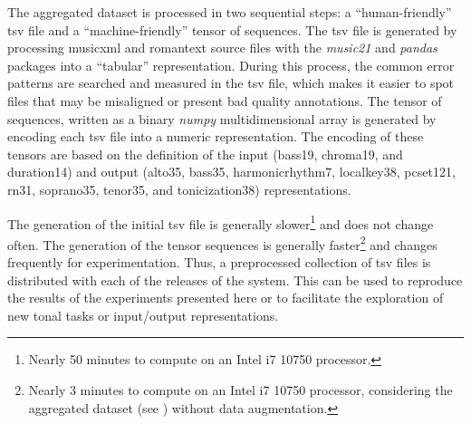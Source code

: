 
The aggregated dataset is processed in two sequential steps:
a ``human-friendly'' \gls{tsv} file and a
``machine-friendly'' tensor of sequences. The \gls{tsv} file
is generated by processing \gls{musicxml} and
\gls{romantext} source files with the \emph{music21}
\parencite{cuthbert2010music21} and \emph{pandas}
\parencite{mckinney2011pandas} packages into a ``tabular''
representation. During this process, the common error
patterns are searched and measured in the \gls{tsv} file,
which makes it easier to spot files that may be misaligned
or present bad quality annotations. The tensor of sequences,
written as a binary \emph{numpy}
\parencite{oliphant2006guide} multidimensional array is
generated by encoding each \gls{tsv} file into a numeric
representation. The encoding of these tensors are based on
the definition of the input (\gls{bass19}, \gls{chroma19},
and \gls{duration14}) and output (\gls{alto35},
\gls{bass35}, \gls{harmonicrhythm7}, \gls{localkey38},
\gls{pcset121}, \gls{rn31}, \gls{soprano35}, \gls{tenor35},
and \gls{tonicization38}) representations.

The generation of the initial \gls{tsv} file is generally
slower\footnote{Nearly 50 minutes to compute on an Intel i7
10750 processor.} and does not change often. The generation
of the tensor sequences is generally faster\footnote{Nearly
3 minutes to compute on an Intel i7 10750 processor,
considering the aggregated dataset (see
) without data augmentation.}
and changes frequently for experimentation. Thus, a
preprocessed collection of \gls{tsv} files is distributed
with each of the releases of the system. This can be used to
reproduce the results of the experiments presented here or
to facilitate the exploration of new tonal tasks or
input/output representations.
